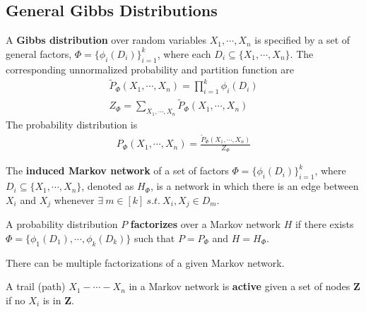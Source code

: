 \documentclass[11pt]{article}
\begin{document}
	\subsection{General Gibbs Distributions}
	\begin{definition}
		A \textbf{Gibbs distribution} over random variables $X_1, \cdots, X_n$ is specified by a set of general factors, $\Phi = \{\phi_i(D_i)\}_{i=1}^k$, where each $D_i \subseteq \{X_1, \cdots, X_n\}$. The corresponding unnormalized probability and partition function are
		\begin{align}
			\tilde{P}_\Phi(X_1, \cdots, X_n) = \prod_{i=1}^k \phi_i(D_i) \\
			Z_\Phi = \sum_{X_1, \cdots, X_n} \tilde{P}_\Phi(X_1, \cdots, X_n)
		\end{align}
		The probability distribution is
		\begin{align}
			P_\Phi(X_1, \cdots, X_n) = \frac{\tilde{P}_\Phi(X_1, \cdots, X_n)}{Z_\Phi}
		\end{align}
	\end{definition}
	
	\begin{definition}
		The \textbf{induced Markov network} of a set of factors $\Phi = \{\phi_i(D_i)\}_{i=1}^k$, where $D_i \subseteq \{X_1, \cdots, X_n\}$, denoted as $H_\Phi$, is a network in which there is an edge between $X_i$ and $X_j$ whenever $\exists\ m \in [k] \ s.t.\ X_i, X_j \in D_m$.
	\end{definition}
	
	\begin{definition}
		A probability distribution $P$ \textbf{factorizes} over a Markov network $H$ if there exists $\Phi = \{\phi_1(D_1), \cdots, \phi_k(D_k)\}$ such that $P = P_\Phi$ and $H = H_\Phi$.
	\end{definition}
	
	\begin{remark}
		There can be multiple factorizations of a given Markov network.
	\end{remark}
	
	\begin{definition}
		A trail (path) $X_1 - \cdots - X_n$ in a Markov network is \textbf{active} given a set of nodes \textbf{Z} if no $X_i$ is in \textbf{Z}.
	\end{definition}
\end{document}
